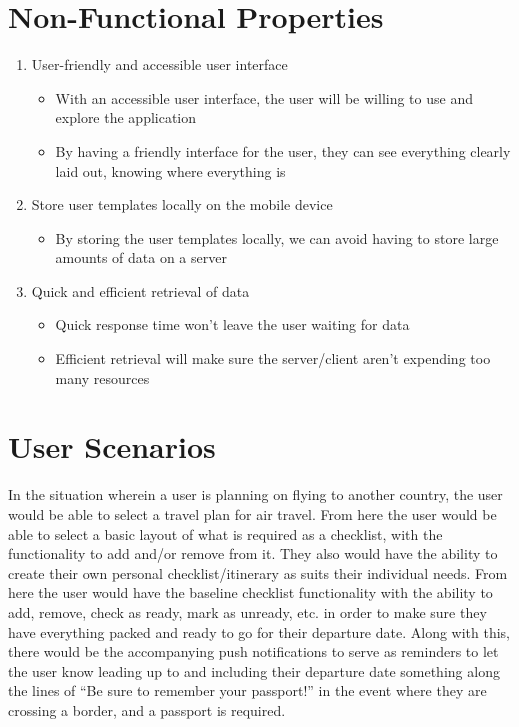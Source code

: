 \documentclass[12pt]{article}
\begin{document}
\section*{Non-Functional Properties}


	\begin{enumerate}

		\item{User-friendly and accessible user interface}
			\begin{itemize}
				\item{With an accessible user interface, the user will be willing to use and explore the application}
				\item{By having a friendly interface for the user, they can see everything clearly laid out, knowing where everything is}
			\end{itemize}

		\item{Store user templates locally on the mobile device}
			\begin{itemize}
				\item{By storing the user templates locally, we can avoid having to store large amounts of data on a server}
			\end{itemize}

		\item{Quick and efficient retrieval of data}
			\begin{itemize}
				\item{Quick response time won't leave the user waiting for data}
				\item{Efficient retrieval will make sure the server/client aren't expending too many resources}
			\end{itemize}
	\end{enumerate}

\pagebreak

\section*{User Scenarios}

	In the situation wherein a user is planning on flying to another country,
	the user would be able to select a travel plan for air travel.
	From here the user would be able to select a basic layout of what is required as a checklist,
	with the functionality to add and/or remove from it.
	They also would have the ability to create their own personal checklist/itinerary as suits their individual needs.
	From here the user would have the baseline checklist functionality with the ability to
	add, remove, check as ready, mark as unready, etc.
	in order to make sure they have everything packed and ready to go for their departure date.
	Along with this, there would be the accompanying push notifications to serve as reminders to
	let the user know leading up to and including their departure date something along the lines of
	``Be sure to remember your passport!'' in the event where they are crossing a border, and a passport is required.
\end{document}
